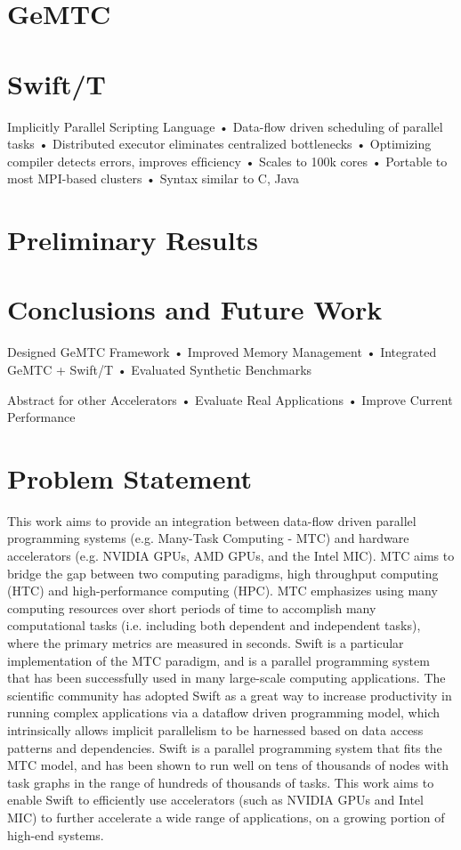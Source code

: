 \documentclass[conference]{IEEEtran}
\begin{document}
\section{GeMTC}

\section{Swift/T}
Implicitly Parallel Scripting Language • Data-ﬂow driven scheduling of parallel tasks • Distributed executor eliminates centralized bottlenecks • Optimizing compiler detects errors, improves efﬁciency • Scales to 100k cores • Portable to most MPI-based clusters • Syntax similar to C, Java

\section{Preliminary Results}

\section{Conclusions and Future Work}
Designed GeMTC Framework
• Improved Memory Management
• Integrated GeMTC + Swift/T
• Evaluated Synthetic Benchmarks

Abstract for other Accelerators
• Evaluate Real Applications
• Improve Current Performance

\section{Problem Statement}
This work aims to provide an integration between data-flow driven parallel programming systems (e.g. Many-Task Computing - MTC) and hardware accelerators \cite{kriederGCASR12} (e.g. NVIDIA GPUs, AMD GPUs, and the Intel MIC). MTC aims to bridge the gap between two computing paradigms, high throughput computing (HTC) and high-performance computing (HPC). MTC emphasizes using many computing resources over short periods of time to accomplish many computational tasks (i.e. including both dependent and independent tasks), where the primary metrics are measured in seconds.\cite{raicu2008toward} Swift is a particular implementation of the MTC paradigm, and is a parallel programming system that has been successfully used in many large-scale computing applications. \cite{zhao2007swift} The scientific community has adopted Swift as a great way to increase productivity in running complex applications via a dataflow driven programming model, which intrinsically allows implicit parallelism to be harnessed based on data access patterns and dependencies. Swift is a parallel programming system that fits the MTC model, and has been shown to run well on tens of thousands of nodes with task graphs in the range of hundreds of thousands of tasks. This work aims to enable Swift to efficiently use accelerators (such as NVIDIA GPUs and Intel MIC) to further accelerate a wide range of applications, on a growing portion of high-end systems.
\end{document}
